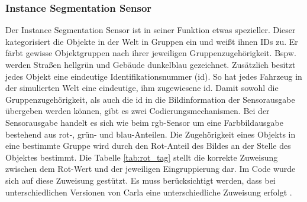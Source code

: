 \subsubsection{Instance Segmentation Sensor}
Der Instance Segmentation Sensor ist in seiner Funktion etwas spezieller. Dieser kategorisiert die Objekte in der Welt in Gruppen ein und weißt ihnen IDs zu. Er färbt gewisse Objektgruppen nach ihrer jeweiligen Gruppenzugehörigkeit. Bspw. werden Straßen hellgrün und Gebäude dunkelblau gezeichnet. Zusätzlich besitzt jedes Objekt eine eindeutige Identifikationsnummer (\acrshort{id}). So hat jedes Fahrzeug in der simulierten Welt eine eindeutige, ihm zugewiesene \acrshort{id}. Damit sowohl die Gruppenzugehörigkeit, als auch die \acrshort{id} in die Bildinformation der Sensorausgabe übergeben werden können, gibt es zwei Codierungsmechanismen. Bei der Sensorausgabe handelt es sich wie beim \acrshort{rgb}-Sensor um eine Farbbildausgabe bestehend aus rot-, grün- und blau-Anteilen. Die Zugehörigkeit eines Objekts in eine bestimmte Gruppe wird durch den Rot-Anteil des Bildes an der Stelle des Objektes bestimmt. Die Tabelle \ref{tab:rot_tag} stellt die korrekte Zuweisung zwischen dem Rot-Wert und der jeweiligen Eingruppierung dar. Im Code wurde sich auf diese Zuweisung gestützt. Es muss berücksichtigt werden, dass bei unterschiedlichen Versionen von Carla eine unterschiedliche Zuweisung erfolgt \cite{lit_website_carla_documentation}. 


